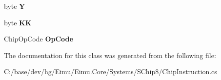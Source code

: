 \begin{DoxyCompactItemize}
\item 
\hypertarget{class_eimu_1_1_core_1_1_systems_1_1_s_chip8_1_1_chip_instruction_a188ad8f3ea1109db5e94307941b14ceb}{
byte {\bfseries Y}}
\label{class_eimu_1_1_core_1_1_systems_1_1_s_chip8_1_1_chip_instruction_a188ad8f3ea1109db5e94307941b14ceb}

\item 
\hypertarget{class_eimu_1_1_core_1_1_systems_1_1_s_chip8_1_1_chip_instruction_a706eaf9ad9a9dbe01a1f34efa9684144}{
byte {\bfseries KK}}
\label{class_eimu_1_1_core_1_1_systems_1_1_s_chip8_1_1_chip_instruction_a706eaf9ad9a9dbe01a1f34efa9684144}

\item 
\hypertarget{class_eimu_1_1_core_1_1_systems_1_1_s_chip8_1_1_chip_instruction_ad9cb2385f1b7d6239ca59d0b7201711d}{
ChipOpCode {\bfseries OpCode}}
\label{class_eimu_1_1_core_1_1_systems_1_1_s_chip8_1_1_chip_instruction_ad9cb2385f1b7d6239ca59d0b7201711d}

\end{DoxyCompactItemize}


The documentation for this class was generated from the following file:\begin{DoxyCompactItemize}
\item 
C:/base/dev/hg/Eimu/Eimu.Core/Systems/SChip8/ChipInstruction.cs\end{DoxyCompactItemize}
